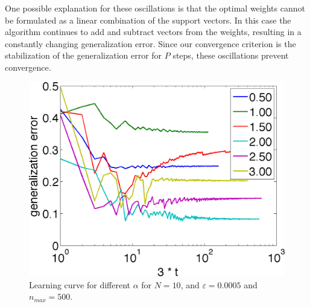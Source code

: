 One possible explanation for these oscillations is that the optimal weights cannot be formulated as a linear combination of the support vectors. In this case the algorithm continues to add and subtract vectors from the weights, resulting in a constantly changing generalization error. Since our convergence criterion is the stabilization of the generalization error for $P$ steps, these oscillations prevent convergence. 

\begin{figure}[H]
	\centering
	\includegraphics[width=0.9\columnwidth]{./img/N5NMAX500error3}
	\caption{Learning curve for different $\alpha$ for $N = 10$, and $\varepsilon = 0.0005$ and $n_{max} = 500$.}
	\label{fig:exp:learningcurve}
\end{figure}